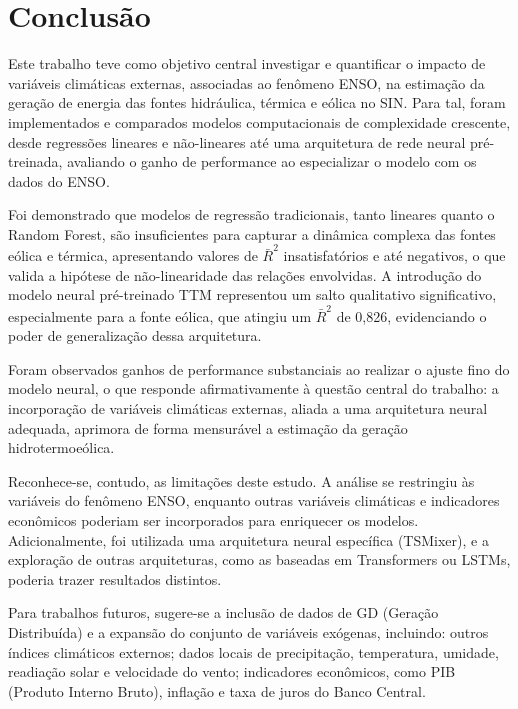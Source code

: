 \chapter{Conclusão}
Este trabalho teve como objetivo central investigar e quantificar o impacto de variáveis climáticas externas, associadas ao 
fenômeno ENSO, na estimação da geração de energia das fontes hidráulica, térmica e eólica no SIN. 
Para tal, foram implementados e comparados modelos computacionais de complexidade crescente, desde regressões lineares e 
não-lineares até uma arquitetura de rede neural pré-treinada, avaliando o ganho de performance ao especializar o modelo com 
os dados do ENSO.

Foi demonstrado que modelos de regressão tradicionais, tanto lineares quanto o Random Forest, são insuficientes para capturar 
a dinâmica complexa das fontes eólica e térmica, apresentando valores de $\bar{R}^2$ insatisfatórios e até negativos, o que valida 
a hipótese de não-linearidade das relações envolvidas. A introdução do modelo neural pré-treinado TTM 
representou um salto qualitativo significativo, especialmente para a fonte eólica, que atingiu um $\bar{R}^2$ de 0,826, evidenciando 
o poder de generalização dessa arquitetura.

Foram observados ganhos de performance substanciais ao realizar o ajuste fino do modelo neural, o que responde afirmativamente 
à questão central do trabalho: a incorporação de variáveis climáticas externas, aliada a uma arquitetura neural adequada, 
aprimora de forma mensurável a estimação da geração hidrotermoeólica.

Reconhece-se, contudo, as limitações deste estudo. A análise se restringiu às variáveis do fenômeno ENSO, enquanto outras 
variáveis climáticas e indicadores econômicos poderiam ser incorporados para enriquecer os modelos. Adicionalmente, foi 
utilizada uma arquitetura neural específica (TSMixer), e a exploração de outras arquiteturas, como as baseadas em Transformers 
ou LSTMs, poderia trazer resultados distintos.

Para trabalhos futuros, sugere-se a inclusão de dados de GD (Geração Distribuída) e a expansão do conjunto de variáveis exógenas, 
incluindo: outros índices climáticos externos; dados locais de precipitação, temperatura, umidade, readiação solar e 
velocidade do vento; indicadores econômicos, como PIB (Produto Interno Bruto), inflação e taxa de juros do Banco Central.